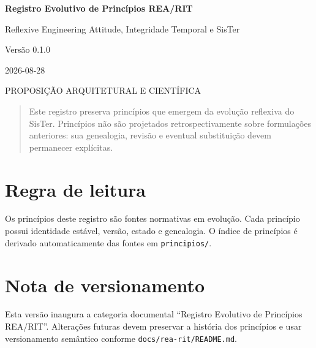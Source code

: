 \documentclass[11pt,a4paper,oneside]{book}
\newcommand{\DocVersion}{0.1.0}
\newcommand{\DocDate}{2026-08-28}
\newcommand{\DocStatus}{PROPOSIÇÃO ARQUITETURAL E CIENTÍFICA}
\begin{document}
\frontmatter

\begin{titlepage}
\centering
\vspace*{3cm}
{\Huge\bfseries Registro Evolutivo de Princípios REA/RIT\par}
\vspace{1cm}
{\Large Reflexive Engineering Attitude, Integridade Temporal e SisTer\par}
\vfill
{\large Versão \DocVersion\par}
{\large \DocDate\par}
{\large \DocStatus\par}
\vfill
\begin{quote}
Este registro preserva princípios que emergem da evolução reflexiva do SisTer.
Princípios não são projetados retrospectivamente sobre formulações anteriores:
sua genealogia, revisão e eventual substituição devem permanecer explícitas.
\end{quote}
\vfill
\end{titlepage}

\tableofcontents

\chapter*{Regra de leitura}
Os princípios deste registro são fontes normativas em evolução. Cada princípio
possui identidade estável, versão, estado e genealogia. O índice de princípios
é derivado automaticamente das fontes em \texttt{principios/}.

\mainmatter


\backmatter
\chapter*{Nota de versionamento}
Esta versão inaugura a categoria documental ``Registro Evolutivo de Princípios
REA/RIT''. Alterações futuras devem preservar a história dos princípios e usar
versionamento semântico conforme \texttt{docs/rea-rit/README.md}.
\end{document}
